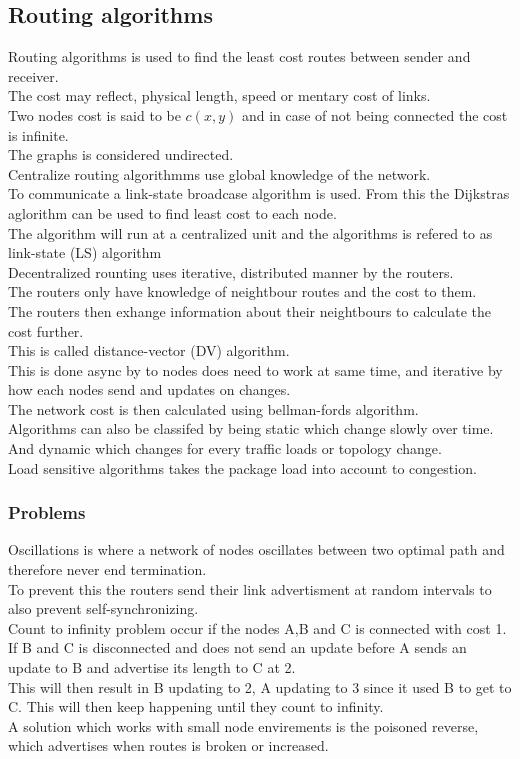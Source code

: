 \documentclass[12pt, a4paper]{article}
\begin{document}
		\subsection{Routing algorithms}
			Routing algorithms is used to find the least cost routes between sender and receiver.\\
			The cost may reflect, physical length, speed or mentary cost of links.\\
			Two nodes cost is said to be $c(x,y)$ and in case of not being connected the cost is infinite.\\
			The graphs is considered undirected.\\
			Centralize routing algorithmms use global knowledge of the network.\\
			To communicate a link-state broadcase algorithm is used. From this the Dijkstras aglorithm can be used to find least cost to each node.\\[4mm]
			The algorithm will run at a centralized unit and the algorithms is refered to as link-state (LS) algorithm\\
			Decentralized rounting uses iterative, distributed manner by the routers.\\
			The routers only have knowledge of neightbour routes and the cost to them.\\
			The routers then exhange information about their neightbours to calculate the cost further.\\
			This is called distance-vector (DV) algorithm.\\
			This is done async by to nodes does need to work at same time, and iterative by how each nodes send and updates on changes.\\
			The network cost is then calculated using bellman-fords algorithm.\\[4mm]
			Algorithms can also be classifed by being static which change slowly over time.\\
			And dynamic which changes for every traffic loads or topology change.\\
			Load sensitive algorithms takes the package load into account to congestion.\\
			\subsubsection{Problems}
				Oscillations is where a network of nodes oscillates between two optimal path and therefore never end termination.\\
				To prevent this the routers send their link advertisment at random intervals to also prevent self-synchronizing.\\
				Count to infinity problem occur if the nodes A,B and C is connected with cost 1.\\
				If B and C is disconnected and does not send an update before A sends an update to B and advertise its length to C at 2.\\
				This will then result in B updating to 2, A updating to 3 since it used B to get to C. This will then keep happening until they count to infinity.\\
				A solution which works with small node envirements is the poisoned reverse, which advertises when routes is broken or increased.
\end{document}
